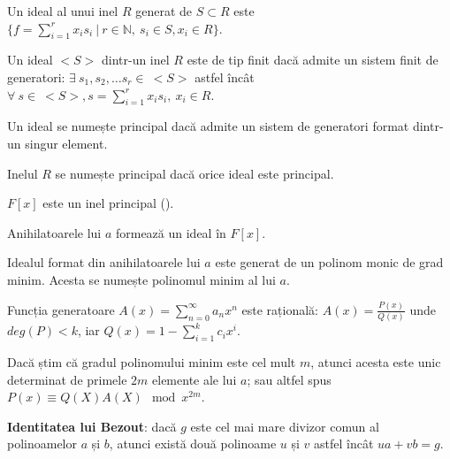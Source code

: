 \begin{defn}
  Un ideal al unui inel $R$ generat de $S \subset R$ este
  $\{f = \displaystyle\sum\limits_{i=1}^{r} x_{i}s_{i} \ | \ r \in \mathbb{N}, \ s_{i} \in S, x_{i} \in R\}$.
\end{defn}

\begin{defn}
  Un ideal $<S>$ dintr-un inel $R$ este de tip finit dacă admite un sistem finit de generatori:
  $\exists \ s_{1}, s_{2}, \ldots s_{r} \in \ <S>$  astfel încât
  $\forall \ s \in \ <S>, s = \displaystyle\sum\limits_{i=1}^{r} x_{i} s_{i}, \ x_{i} \in R$.
\end{defn}

\begin{defn}
  Un ideal se numește principal dacă admite un sistem de generatori format
  dintr-un singur element.
\end{defn}

\begin{defn}
  Inelul $R$ se numește principal dacă orice ideal este principal.
\end{defn}

\begin{thm}
  $F[x]$ este un inel principal (\cite{abstractalgebra}).
\end{thm}

\begin{lem}
  Anihilatoarele lui $a$ formează un ideal în $F[x]$.
\end{lem}

\begin{clr}
  Idealul format din anihilatoarele lui $a$ este generat de un polinom monic de
  grad minim. Acesta se numește polinomul minim al lui $a$.
\end{clr}

\begin{thm}
  Funcția generatoare $A(x) = \displaystyle\sum\limits_{n=0}^{\infty} a_{n}x^{n}$ este rațională:
  $A(x) = \frac{P(x)}{Q(x)}$ unde $deg(P) < k$, iar $Q(x) = 1 - \displaystyle\sum\limits_{i=1}^{k} c_{i}x^{i}$.
\end{thm}

\begin{thm}
  Dacă știm că gradul polinomului minim este cel mult $m$, atunci acesta este
  unic determinat de primele $2m$ elemente ale lui $a$; sau altfel spus
  $P(x) \equiv Q(X) A(X) \mod x^{2m}$.
\end{thm}

\noindent \textbf{Identitatea lui Bezout}: dacă $g$ este cel mai mare divizor comun al
polinoamelor $a$ și $b$, atunci există două polinoame $u$ și $v$ astfel încât
$ua + vb = g$.

